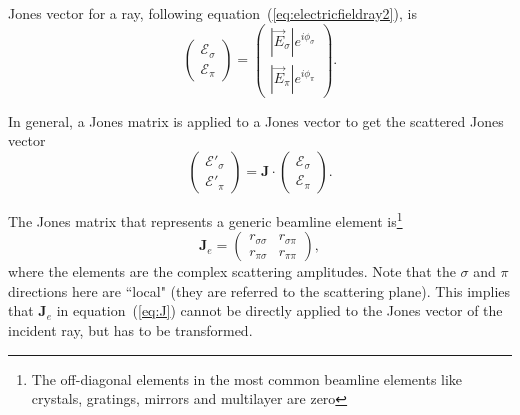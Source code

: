 \documentclass{iucr}
\begin{document}
Jones vector for a ray, following equation~(\ref{eq:electricfieldray2}), is
\begin{equation}
        \begin{pmatrix}
        \mathcal{E}_\sigma \\
        \mathcal{E}_\pi
    \end{pmatrix}
    =
    \begin{pmatrix}
        |\vec{E}_{\sigma}| e^{i \phi_\sigma} \\
        |\vec{E}_{\pi}| e^{i \phi_\pi}
    \end{pmatrix}.
\end{equation}

In general, a Jones matrix is applied to a Jones vector to get the scattered Jones vector
\begin{equation}\label{eq:applyJones}
    \begin{pmatrix}
        \mathcal{E}'_\sigma \\
        \mathcal{E}'_\pi
    \end{pmatrix}
    =
    \textbf{J}
    \cdot
    \begin{pmatrix}
        \mathcal{E}_\sigma\\
        \mathcal{E}_\pi
    \end{pmatrix}.
\end{equation}

The Jones matrix that represents a generic beamline element is\footnote{The off-diagonal elements in the most common beamline elements like crystals, gratings, mirrors and multilayer are zero}
\begin{equation}\label{eq:J}
\textbf{J}_e = 
\begin{pmatrix}
r_{\sigma\sigma} & r_{\sigma\pi}\\
r_{\pi\sigma} & r_{\pi\pi}
\end{pmatrix},
\end{equation}
where the elements are the complex scattering amplitudes.
Note that the $\sigma$ and $\pi$ directions here are ``local" (they are referred to the scattering plane). 
This implies that $\textbf{J}_e$ in equation~(\ref{eq:J}) cannot be directly applied to the Jones vector of the incident ray, but has to be transformed. 
\end{document}
